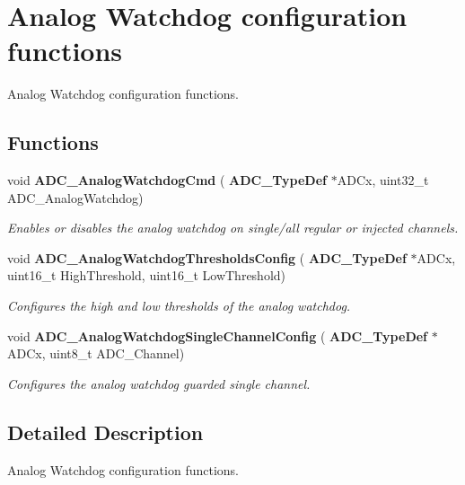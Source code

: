 \section{Analog Watchdog configuration functions}
\label{group__ADC__Group2}


Analog Watchdog configuration functions.  


\subsection*{Functions}
\begin{DoxyCompactItemize}
\item 
void \textbf{ A\+D\+C\+\_\+\+Analog\+Watchdog\+Cmd} (\textbf{ A\+D\+C\+\_\+\+Type\+Def} $\ast$A\+D\+Cx, uint32\+\_\+t A\+D\+C\+\_\+\+Analog\+Watchdog)
\begin{DoxyCompactList}\small\item\em Enables or disables the analog watchdog on single/all regular or injected channels. \end{DoxyCompactList}\item 
void \textbf{ A\+D\+C\+\_\+\+Analog\+Watchdog\+Thresholds\+Config} (\textbf{ A\+D\+C\+\_\+\+Type\+Def} $\ast$A\+D\+Cx, uint16\+\_\+t High\+Threshold, uint16\+\_\+t Low\+Threshold)
\begin{DoxyCompactList}\small\item\em Configures the high and low thresholds of the analog watchdog. \end{DoxyCompactList}\item 
void \textbf{ A\+D\+C\+\_\+\+Analog\+Watchdog\+Single\+Channel\+Config} (\textbf{ A\+D\+C\+\_\+\+Type\+Def} $\ast$A\+D\+Cx, uint8\+\_\+t A\+D\+C\+\_\+\+Channel)
\begin{DoxyCompactList}\small\item\em Configures the analog watchdog guarded single channel. \end{DoxyCompactList}\end{DoxyCompactItemize}


\subsection{Detailed Description}
Analog Watchdog configuration functions. 

